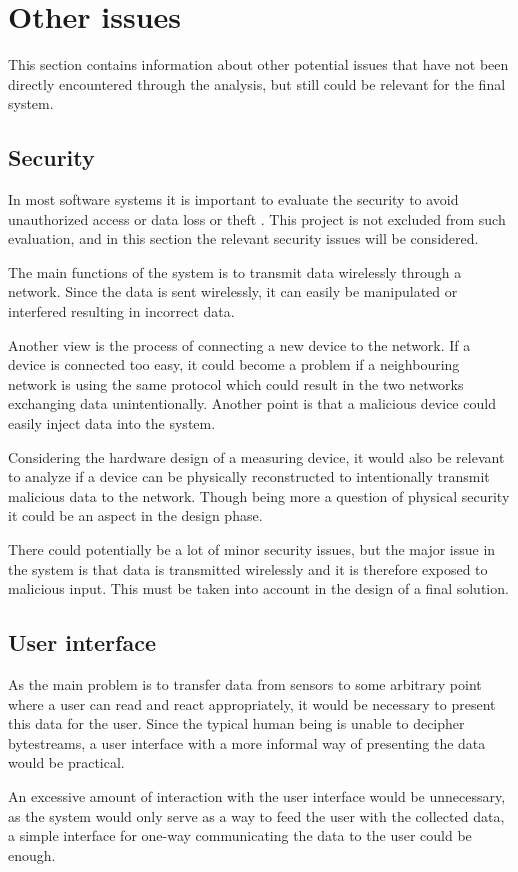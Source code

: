 \section{Other issues}
This section contains information about other potential issues that have not been directly encountered through the analysis, but still could be relevant for the final system.

\subsection{Security}
In most software systems it is important to evaluate the security to avoid unauthorized access or data loss or theft . This project is not excluded from such evaluation, and in this section the relevant security issues will be considered.

The main functions of the system is to transmit data wirelessly through a network. Since the data is sent wirelessly, it can easily be manipulated or interfered resulting in incorrect data.

Another view is the process of connecting a new device to the network. If a device is connected too easy, it could become a problem if a neighbouring network is using the same protocol which could result in the two networks exchanging data unintentionally. Another point is that a malicious device could easily inject data into the system.

Considering the hardware design of a measuring device, it would also be relevant to analyze if a device can be physically reconstructed to intentionally transmit malicious data to the network. Though being more a question of physical security it could be an aspect in the design phase.

There could potentially be a lot of minor security issues, but the major issue in the system is that data is transmitted wirelessly and it is therefore exposed to malicious input. This must be taken into account in the design of a final solution.

\subsection{User interface}
As the main problem is to transfer data from sensors to some arbitrary point where a user can read and react appropriately, it would be necessary to present this data for the user. Since the typical human being is unable to decipher bytestreams, a user interface with a more informal way of presenting the data would be practical.

An excessive amount of interaction with the user interface would be unnecessary, as the system would only serve as a way to feed the user with the collected data, a simple interface for one-way communicating the data to the user could be enough.
